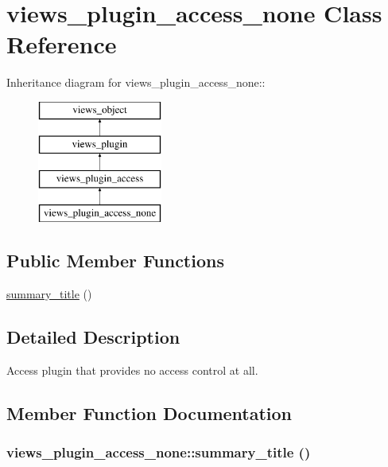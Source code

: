 \hypertarget{classviews__plugin__access__none}{
\section{views\_\-plugin\_\-access\_\-none Class Reference}
\label{classviews__plugin__access__none}
}
Inheritance diagram for views\_\-plugin\_\-access\_\-none::\begin{figure}[H]
\begin{center}
\leavevmode
\includegraphics[height=4cm]{classviews__plugin__access__none}
\end{center}
\end{figure}
\subsection*{Public Member Functions}
\begin{CompactItemize}
\item 
\hyperlink{classviews__plugin__access__none_b76847f19e943e463cbc2ff1723bdb00}{summary\_\-title} ()
\end{CompactItemize}


\subsection{Detailed Description}
Access plugin that provides no access control at all. 

\subsection{Member Function Documentation}
\hypertarget{classviews__plugin__access__none_b76847f19e943e463cbc2ff1723bdb00}{
\subsubsection[{summary\_\-title}]{\setlength{\rightskip}{0pt plus 5cm}views\_\-plugin\_\-access\_\-none::summary\_\-title ()}}
\label{classviews__plugin__access__none_b76847f19e943e463cbc2ff1723bdb00}


